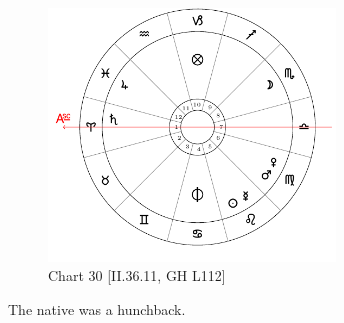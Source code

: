 \clearpage
\begin{figure}
\centering
\vspace{-20pt}
\includegraphics[width=0.68\textwidth]{charts/2_36_11}
\caption{Chart 30 [II.36.11, GH L112]}
\label{fig:chart30}
\end{figure}


The native was a hunchback.

\newpage